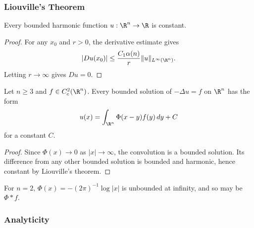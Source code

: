 \subsubsection{Liouville's Theorem}
\label{sec:laplace-liouvilles-theorem}

\begin{theorem}
\label{thm:liouville-theorem-harmonic}
\leanok
{}
Every bounded harmonic function $u:\R^n\to\R$ is constant.
\end{theorem}
\begin{proof}
\leanok
\sketch For any $x_0$ and $r>0$, the derivative estimate gives
$$|Du(x_0)|\le\frac{C_1\alpha(n)}r\|u\|_{L^\infty(\R^n)}.$$
Letting $r\to\infty$ gives $Du=0$.
\end{proof}

\begin{theorem}
\label{thm:representation-formula-bounded-solutions}
Let $n\ge3$ and $f\in C_c^2(\R^n)$. Every bounded solution of
$-\Delta u=f$ on $\R^n$ has the form
$$u(x)=\int_{\R^n}\Phi(x-y)f(y)\,dy+C$$
for a constant $C$.
\end{theorem}
\begin{proof}
\sketch Since $\Phi(x)\to0$ as $|x|\to\infty$, the convolution is a bounded
solution. Its difference from any other bounded solution is bounded and
harmonic, hence constant by Liouville's theorem.
\end{proof}

\begin{remark}
\label{rem:representation-formula-n2-unbounded}
For $n=2$, $\Phi(x)=-(2\pi)^{-1}\log|x|$ is unbounded at infinity, and so may
be $\Phi*f$.
\end{remark}

\subsubsection{Analyticity}
\label{sec:laplace-analyticity}

